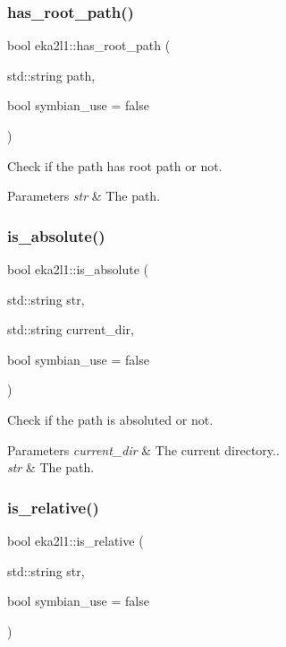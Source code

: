 \subsubsection{\texorpdfstring{has\+\_\+root\+\_\+path()}{has\_root\_path()}}
{\footnotesize\ttfamily bool eka2l1\+::has\+\_\+root\+\_\+path (\begin{DoxyParamCaption}\item[{std\+::string}]{path,  }\item[{bool}]{symbian\+\_\+use = {\ttfamily false} }\end{DoxyParamCaption})}



Check if the path has root path or not. 


\begin{DoxyParams}{Parameters}
{\em str} & The path. \\
\hline
\end{DoxyParams}
\mbox{\label{namespaceeka2l1_a7d49f9297703c51fbaab62eaa49a5d6d}} 
\subsubsection{\texorpdfstring{is\+\_\+absolute()}{is\_absolute()}}
{\footnotesize\ttfamily bool eka2l1\+::is\+\_\+absolute (\begin{DoxyParamCaption}\item[{std\+::string}]{str,  }\item[{std\+::string}]{current\+\_\+dir,  }\item[{bool}]{symbian\+\_\+use = {\ttfamily false} }\end{DoxyParamCaption})}



Check if the path is absoluted or not. 


\begin{DoxyParams}{Parameters}
{\em current\+\_\+dir} & The current directory.. \\
\hline
{\em str} & The path. \\
\hline
\end{DoxyParams}
\mbox{\label{namespaceeka2l1_adfe165adc08702031d44576b65afd569}} 
\subsubsection{\texorpdfstring{is\+\_\+relative()}{is\_relative()}}
{\footnotesize\ttfamily bool eka2l1\+::is\+\_\+relative (\begin{DoxyParamCaption}\item[{std\+::string}]{str,  }\item[{bool}]{symbian\+\_\+use = {\ttfamily false} }\end{DoxyParamCaption})}



